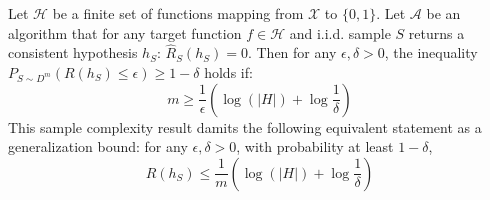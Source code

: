 \begin{theorem}
	Let $\mathcal{H}$ be a finite set of functions mapping from $\mathcal{X}$ to $\{0,1\}$. Let $\mathcal{A}$ be an algorithm that for any target function $f \in \mathcal{H}$ and i.i.d. sample $S$ returns a consistent hypothesis $h_S$: $\hat{R}_S (h_S)=0$. Then for any $\epsilon, \delta > 0 $, the inequality $P_{S \sim D^m} (R(h_S) \leq \epsilon ) \geq 1-\delta$ holds if:
	\begin{equation}
	m \geq \frac{1}{\epsilon}(\log(|H|) + \log \frac{1}{\delta})
	\end{equation}
	This sample complexity result damits the following equivalent statement as a generalization bound: for any $\epsilon, \delta > 0 $, with probability at least $1-\delta$,
	\begin{equation}
	R(h_S) \leq \frac{1}{m} (\log(|H|) + \log \frac{1}{\delta})
	\end{equation}
\end{theorem}

